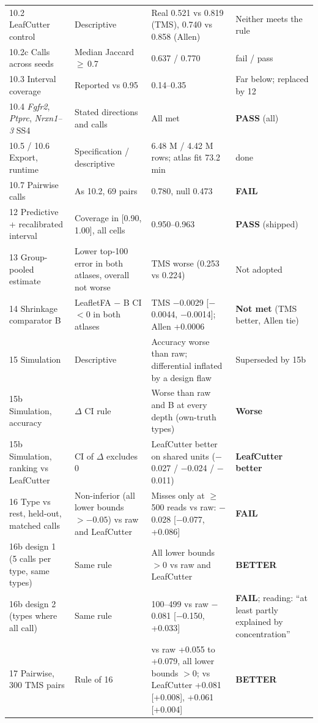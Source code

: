 \documentclass[10pt]{article}
\newcommand{\m}{$-$}
\newcommand{\gee}{$\geq$\,}
\begin{document}
\begin{longtable}{L{25mm}L{44mm}L{68mm}L{24mm}}
10.2 LeafCutter control & Descriptive & Real 0.521 vs 0.819 (TMS), 0.740 vs 0.858 (Allen) & Neither meets the rule \\
10.2c Calls across seeds & Median Jaccard \gee0.7 & 0.637 / 0.770 & fail / pass \\
10.3 Interval coverage & Reported vs 0.95 & 0.14--0.35 & Far below; replaced by 12 \\
10.4 \textit{Fgfr2}, \textit{Ptprc}, \textit{Nrxn1--3} SS4 & Stated directions and calls & All met & \textbf{PASS} (all) \\
10.5 / 10.6 Export, runtime & Specification / descriptive & 6.48 M / 4.42 M rows; atlas fit 73.2 min & done \\
10.7 Pairwise calls & As 10.2, 69 pairs & 0.780, null 0.473 & \textbf{FAIL} \\
12 Predictive + recalibrated interval & Coverage in [0.90, 1.00], all cells & 0.950--0.963 & \textbf{PASS} (shipped) \\
13 Group-pooled estimate & Lower top-100 error in both atlases, overall not worse & TMS worse (0.253 vs 0.224) & Not adopted \\
14 Shrinkage comparator B & LeafletFA $-$ B CI $<0$ in both atlases & TMS \m0.0029 [\m0.0044, \m0.0014]; Allen +0.0006 & \textbf{Not met} (TMS better, Allen tie) \\
15 Simulation & Descriptive & Accuracy worse than raw; differential inflated by a design flaw & Superseded by 15b \\
15b Simulation, accuracy & $\Delta$ CI rule & Worse than raw and B at every depth (own-truth types) & \textbf{Worse} \\
15b Simulation, ranking vs LeafCutter & CI of $\Delta$ excludes 0 & LeafCutter better on shared units (\m0.027 / \m0.024 / \m0.011) & \textbf{LeafCutter better} \\
16 Type vs rest, held-out, matched calls & Non-inferior (all lower bounds $>{-}0.05$) vs raw and LeafCutter & Misses only at \gee500 reads vs raw: \m0.028 [\m0.077, +0.086] & \textbf{FAIL} \\
16b design 1 (5 calls per type, same types) & Same rule & All lower bounds $>0$ vs raw and LeafCutter & \textbf{BETTER} \\
16b design 2 (types where all call) & Same rule & 100--499 vs raw \m0.081 [\m0.150, +0.033] & \textbf{FAIL}; reading: ``at least partly explained by concentration'' \\
17 Pairwise, 300 TMS pairs & Rule of 16 & vs raw +0.055 to +0.079, all lower bounds $>0$; vs LeafCutter +0.081 [+0.008], +0.061 [+0.004] & \textbf{BETTER} \\

\end{longtable}
\end{document}
